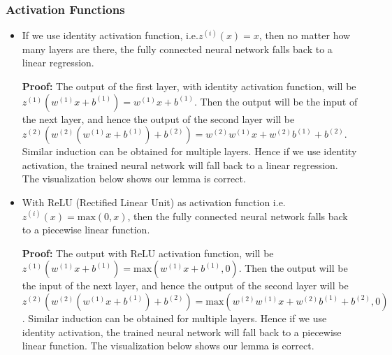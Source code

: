 \subsubsection{Activation Functions}

\begin{itemize}
\item
  If we use identity activation function, i.e.$z^{(i)}(x)=x$, then no
  matter how many layers are there, the fully connected neural network
  falls back to a linear regression.

  \textbf{Proof:} The output of the first layer, with identity
  activation function, will be
  \(z^{(1)}(w^{(1)}x+b^{(1)})=w^{(1)}x+b^{(1)}\). Then the output will
  be the input of the next layer, and hence the output of the second
  layer will be
  \(z^{(2)}(w^{(2)}(w^{(1)}x+b^{(1)})+b^{(2)})=w^{(2)}w^{(1)}x+w^{(2)}b^{(1)}+b^{(2)}\).
  Similar induction can be obtained for multiple layers. Hence if we use
  identity activation, the trained neural network will fall back to a
  linear regression. The visualization below shows our lemma is correct.
\item
  With ReLU (Rectified Linear Unit) as activation function
  i.e.~\(z^{(i)}(x)=\text{max}(0,x)\), then the fully connected neural
  network falls back to a piecewise linear function.

  \textbf{Proof:} The output with ReLU activation function, will be
  \(z^{(1)}(w^{(1)}x+b^{(1)})=\text{max}(w^{(1)}x+b^{(1)}, 0)\). Then
  the output will be the input of the next layer, and hence the output
  of the second layer will be
  \(z^{(2)}(w^{(2)}(w^{(1)}x+b^{(1)})+b^{(2)})=\text{max}(w^{(2)}w^{(1)}x+w^{(2)}b^{(1)}+b^{(2)},0)\).
  Similar induction can be obtained for multiple layers. Hence if we use
  identity activation, the trained neural network will fall back to a
  piecewise linear function. The visualization below shows our lemma is
  correct.
\end{itemize}